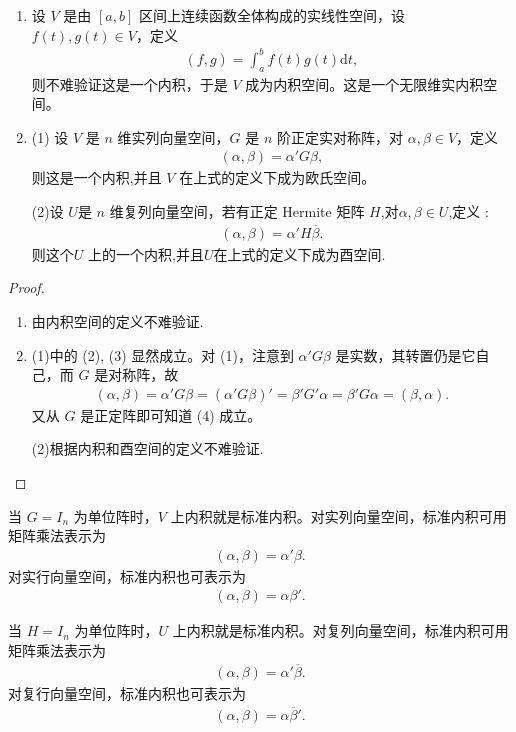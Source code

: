 \documentclass[../../main.tex]{subfiles}%
\begin{document}
\begin{example}\label{example:一些常见的内积及内积空间}
\begin{enumerate}
\item 设 \(V\) 是由 \([a,b]\) 区间上连续函数全体构成的实线性空间，设 \(f(t),g(t)\in V\)，定义
\begin{align*}
(f,g)=\int_{a}^{b}f(t)g(t)\mathrm{d}t,
\end{align*}
则不难验证这是一个内积，于是 \(V\) 成为内积空间。这是一个无限维实内积空间。

\item (1) 设 \(V\) 是 \(n\) 维实列向量空间，\(G\) 是 \(n\) 阶正定实对称阵，对 \(\alpha,\beta\in V\)，定义
\begin{align*}
(\alpha,\beta)=\alpha'G\beta,
\end{align*}
则这是一个内积,并且 \(V\) 在上式的定义下成为欧氏空间。

(2)设 \(U\)是 \(n\) 维复列向量空间，若有正定 Hermite 矩阵 \(H\),对$\alpha ,\beta \in U$,定义 :
\begin{align*}
(\alpha,\beta)=\alpha'H\overline{\beta}.
\end{align*}
则这个\(U\) 上的一个内积,并且$U$在上式的定义下成为酉空间.
\end{enumerate}
\end{example}
\begin{proof}
\begin{enumerate}
\item 由内积空间的定义不难验证.

\item (1)中的 (2), (3) 显然成立。对 (1)，注意到 \(\alpha'G\beta\) 是实数，其转置仍是它自己，而 \(G\) 是对称阵，故
\begin{align*}
(\alpha,\beta)=\alpha'G\beta=(\alpha'G\beta)'=\beta'G'\alpha=\beta'G\alpha=(\beta,\alpha).
\end{align*}
又从 \(G\) 是正定阵即可知道 (4) 成立。 

(2)根据内积和酉空间的定义不难验证.
\end{enumerate}
\end{proof}
\begin{remark}
当 \(G = I_n\) 为单位阵时，\(V\) 上内积就是标准内积。对实列向量空间，标准内积可用矩阵乘法表示为
\begin{align*}
(\alpha,\beta)=\alpha'\beta.
\end{align*}
对实行向量空间，标准内积也可表示为
\begin{align*}
(\alpha,\beta)=\alpha\beta'.
\end{align*}

当 \(H = I_n\) 为单位阵时，\(U\) 上内积就是标准内积。对复列向量空间，标准内积可用矩阵乘法表示为
\begin{align*}
(\alpha,\beta)=\alpha'\overline{\beta}.
\end{align*}
对复行向量空间，标准内积也可表示为
\begin{align*}
(\alpha,\beta)=\alpha\overline{\beta}'.
\end{align*} 
\end{remark}
\end{document}
